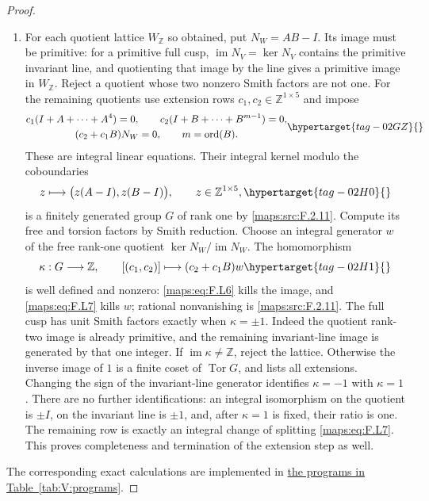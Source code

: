 \documentclass[11pt,a4paper]{article}
\numberwithin{equation}{section}
\theoremstyle{definition}
\begin{document}
\begin{proof}
\begin{enumerate}[label=\arabic*.]
\item For each quotient lattice $W_{\mathbb Z}$ so obtained,
put $N_W=AB-I$.
Its image must be primitive: for a primitive full cusp,
$\operatorname{im}N_V=\ker N_V$ contains the primitive
invariant line, and quotienting that image by the line
gives a primitive image in $W_{\mathbb Z}$.
Reject a quotient whose two nonzero Smith factors are
not one.  For the remaining quotients use extension rows
$c_1,c_2\in\mathbb Z^{1\times5}$ and impose
\begin{equation}
\begin{gathered}
 c_1(I+A+\cdots+A^4)=0,
 \qquad c_2(I+B+\cdots+B^{m-1})=0,\\
 (c_2+c_1B)N_W=0,
 \qquad m=\operatorname{ord}(B).
\end{gathered}
 \hypertarget{tag-02GZ}{}\label{maps:eq:F.L6}
\end{equation}
These are integral linear equations.  Their integral kernel
modulo the coboundaries
\begin{equation}
 z\longmapsto\bigl(z(A-I),z(B-I)\bigr),
 \qquad z\in\mathbb Z^{1\times5},
 \hypertarget{tag-02H0}{}\label{maps:eq:F.L7}
\end{equation}
is a finitely generated group $G$ of rank one by \ref{maps:src:F.2.11}.
Compute its free and torsion factors by Smith reduction.
Choose an integral generator $w$ of the free rank-one
quotient $\ker N_W/\operatorname{im}N_W$.
The homomorphism
\begin{equation}
 \kappa:G\longrightarrow\mathbb Z,
 \qquad [(c_1,c_2)]\longmapsto(c_2+c_1B)w
 \hypertarget{tag-02H1}{}\label{maps:eq:F.L8}
\end{equation}
is well defined and nonzero: \eqref{maps:eq:F.L6} kills the image, and
\eqref{maps:eq:F.L7} kills $w$; rational nonvanishing is \ref{maps:src:F.2.11}.
The full cusp has unit Smith factors exactly when
$\kappa=\pm1$.
Indeed the quotient rank-two image is already primitive,
and the remaining invariant-line image is generated by
that one integer.
If $\operatorname{im}\kappa\ne\mathbb Z$, reject the
lattice.  Otherwise the inverse image of $1$ is a finite
coset of $\operatorname{Tor}G$, and lists all extensions.
Changing the sign of the invariant-line generator identifies
$\kappa=-1$ with $\kappa=1$.
There are no further identifications: an integral isomorphism
on the quotient is $\pm I$, on the invariant line is
$\pm1$, and, after $\kappa=1$ is fixed, their ratio is one.
The remaining row is exactly an integral change of splitting
\eqref{maps:eq:F.L7}.
This proves completeness and termination of the extension
step as well.



\end{enumerate}
The corresponding exact calculations are implemented in \hyperlink{prog:V:lattices}{the programs in Table~\ref*{tab:V:programs}}.
\end{proof}
\end{document}
